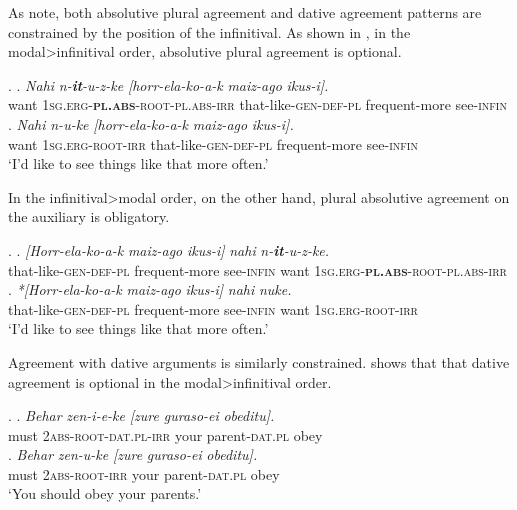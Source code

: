 \documentclass[output=paper]{langscibook}
\begin{document}
As \cite{etxepare-uribeetxebarria2009} note, both absolutive plural agreement and dative agreement patterns are constrained by the position of the infinitival.  As shown in \Next, in the modal>infinitival order, absolutive plural agreement is optional.

\ex. 	\ag. 	\textit{Nahi}    \textit{n-\textbf{it}-u-z-ke                                         } \textit{[horr-ela-ko-a-k }           \textit{maiz-ago }         \textit{ikus-i].}        \\
	want   \textsc{1sg.erg-\textbf{pl.abs}-root-pl.abs-irr}    that-like-\textsc{gen-def-pl}  frequent-more see-\textsc{infin} \\
	\bg. 	\textit{Nahi}    \textit{n-u-ke}                      	   \textit{[horr-ela-ko-a-k}                \textit{maiz-ago}          \textit{ikus-i].} \\
  	want   \textsc{1sg.erg-root-irr}    that-like-\textsc{gen-def-pl}  frequent-more see-\textsc{infin} \\
		`I'd like to see things like that more often.'\\
\citep{etxepare-uribeetxebarria2009}

In the infinitival>modal order, on the other hand, plural absolutive agreement on the auxiliary is obligatory.

\ex.	\ag. 	\textit{[Horr-ela-ko-a-k }             \textit{maiz-ago}         \textit{ikus-i]}         \textit{nahi}    \textit{n-\textbf{it}-u-z-ke.}  \\
     that-like-\textsc{gen-def-pl}  frequent-more see-\textsc{infin}  want     
        \textsc{1sg.erg-\textbf{pl.abs}-root-pl.abs-irr}    \\
     	\bg. \textit{*[Horr-ela-ko-a-k}              \textit{maiz-ago}         \textit{ikus-i]}         \textit{nahi}   \textit{nuke.}   \\  
       that-like-\textsc{gen-def-pl}  frequent-more see-\textsc{infin}  want \textsc{1sg.erg-root-irr}  \\   
      `I'd like to see things like that more often.' \\
	\citep{etxepare-uribeetxebarria2009}


Agreement with dative arguments is similarly constrained.  \Next shows that that dative agreement is optional in the modal>infinitival order. 

\ex. 	\ag. 	\textit{Behar}  \textit{zen-i-e-ke} 		             \textit{[zure guraso-ei}              \textit{obeditu].} \\
             	must   \textsc{2abs-root-dat.pl-irr}    your parent-\textsc{dat.pl}   obey  \\
	\bg.	\textit{Behar} \textit{zen-u-ke} 	         \textit{[zure} \textit{guraso-ei} \textit{obeditu].} \\
	    must   \textsc{2abs-root-irr}   your parent-\textsc{dat.pl}   obey    \\    
	 	`You should obey your parents.'\\
			\citep{etxepare-uribeetxebarria2009}
\end{document}
